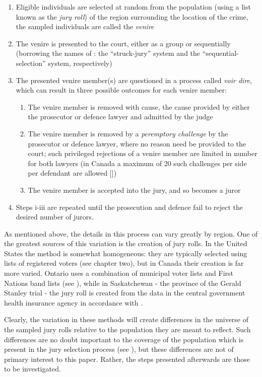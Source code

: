 \begin{enumerate}
  \item Eligible individuals are selected at random from the population (using a list known as the \textit{jury roll}) of the
    region surrounding the location of the crime, the sampled individuals are called the \textit{venire}
  \item The venire is presented to the court, either as a group or sequentially (borrowing the names of \cite{ford2010}: the
    ``struck-jury'' system and the ``sequential-selection'' system, respectively)
  \item The presented venire member(s) are questioned in a process called \textit{voir dire}, which can result in three possible
    outcomes for each venire member:
    \begin{enumerate}
      \item The venire member is removed with cause, the cause provided by either the prosecutor or defence lawyer and admitted by
        the judge
      \item The venire member is removed by a \textit{peremptory challenge} by the prosecutor or defence lawyer, where no reason
        need be provided to the court; such privileged rejections of a venire member are limited in number for both lawyers (in
        Canada a maximum of 20 such challenges per side per defendant are allowed [\cite{perempchallaw}])
      \item The venire member is accepted into the jury, and so becomes a juror
    \end{enumerate}
  \item Steps i-iii are repeated until the prosecution and defence fail to reject the desired number of jurors.
\end{enumerate}

As mentioned above, the details in this process can vary greatly by region. One of the greatest sources of this variation is the
creation of jury rolls. In the United States the method is somewhat homogeneous: they are typically selected using lists of
registered voters (see \cite{vandykejurysel} chapter two), but in Canada their creation is far more varied. Ontario uses a
combination of municipal voter lists and First Nations band lists (see \cite{ontariojuryroll}), while in Saskatchewan - the
province of the Gerald Stanley trial - the jury roll is created from the data in the central government health insurance agency in
accordance with \cite{saskjuryact}.

Clearly, the variation in these methods will create differences in the universe of the sampled jury rolls relative to the
population they are meant to reflect. Such differences are no doubt important to the coverage of the population which is present
in the jury selection process (see \cite{iacobuccireport}), but these differences are not of primary interest to this
paper. Rather, the steps presented afterwards are those to be investigated.

